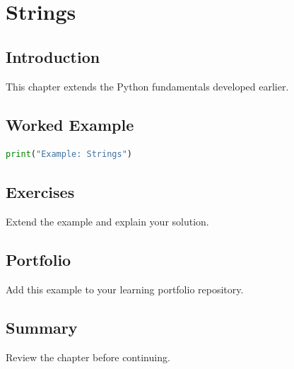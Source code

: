 \chapter{Strings}
\label{chap:vol3-13}



\section{Introduction}
This chapter extends the Python fundamentals developed earlier.

\section{Worked Example}
\begin{lstlisting}[language=Python]
print("Example: Strings")
\end{lstlisting}

\section{Exercises}
\begin{exercise}
Extend the example and explain your solution.
\end{exercise}

\section{Portfolio}
Add this example to your learning portfolio repository.

\section{Summary}
Review the chapter before continuing.
